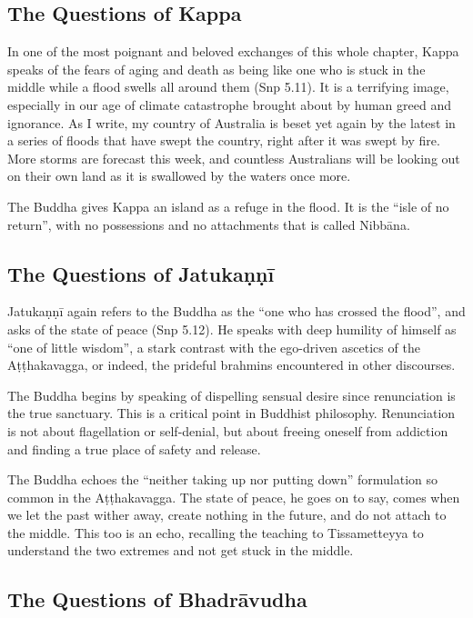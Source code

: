 \documentclass[12pt,openany]{book}%
\begin{document}
\subsection*{The Questions of Kappa}

In one of the most poignant and beloved exchanges of this whole chapter, Kappa speaks of the fears of aging and death as being like one who is stuck in the middle while a flood swells all around them (Snp 5.11). It is a terrifying image, especially in our age of climate catastrophe brought about by human greed and ignorance. As I write, my country of Australia is beset yet again by the latest in a series of floods that have swept the country, right after it was swept by fire. More storms are forecast this week, and countless Australians will be looking out on their own land as it is swallowed by the waters once more.

The Buddha gives Kappa an island as a refuge in the flood. It is the “isle of no return”, with no possessions and no attachments that is called \textsanskrit{Nibbāna}.

\subsection*{The Questions of \textsanskrit{Jatukaṇṇī}}

\textsanskrit{Jatukaṇṇī} again refers to the Buddha as the “one who has crossed the flood”, and asks of the state of peace (Snp 5.12). He speaks with deep humility of himself as “one of little wisdom”, a stark contrast with the ego-driven ascetics of the \textsanskrit{Aṭṭhakavagga}, or indeed, the prideful brahmins encountered in other discourses.

The Buddha begins by speaking of dispelling sensual desire since renunciation is the true sanctuary. This is a critical point in Buddhist philosophy. Renunciation is not about flagellation or self-denial, but about freeing oneself from addiction and finding a true place of safety and release.

The Buddha echoes the “neither taking up nor putting down” formulation so common in the \textsanskrit{Aṭṭhakavagga}. The state of peace, he goes on to say, comes when we let the past wither away, create nothing in the future, and do not attach to the middle. This too is an echo, recalling the teaching to Tissametteyya to understand the two extremes and not get stuck in the middle.

\subsection*{The Questions of \textsanskrit{Bhadrāvudha}}
\end{document}
